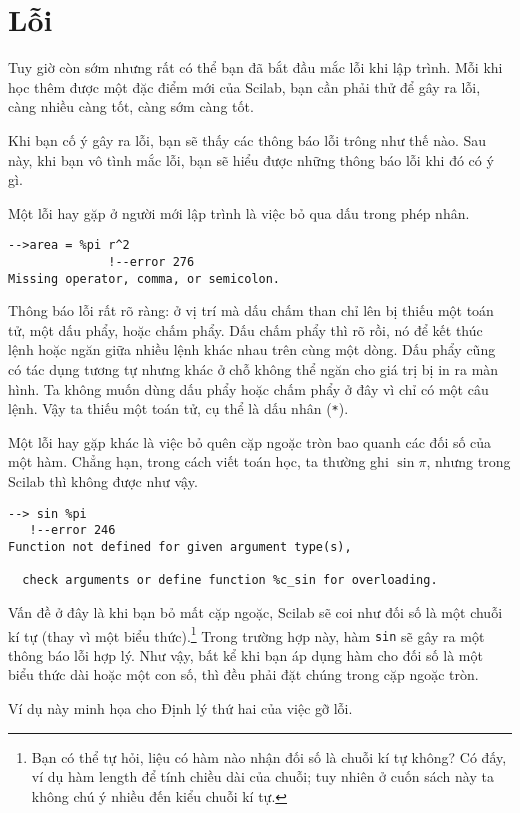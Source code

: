 \documentclass[12pt]{book}
\begin{document}
\section{Lỗi}

Tuy giờ còn sớm nhưng rất có thể bạn đã bắt đầu mắc lỗi khi lập trình.
Mỗi khi học thêm được một đặc điểm mới của Scilab, bạn cần phải
thử để gây ra lỗi, càng nhiều càng tốt, càng sớm càng tốt.

Khi bạn cố ý gây ra lỗi, bạn sẽ thấy các thông báo lỗi trông như thế nào.
Sau này, khi bạn vô tình mắc lỗi, bạn sẽ hiểu được những thông báo lỗi
khi đó có ý gì.

Một lỗi hay gặp ở người mới lập trình là việc bỏ qua dấu {\tt *} trong
phép nhân.

\begin{verbatim}
-->area = %pi r^2
              !--error 276 
Missing operator, comma, or semicolon.
\end{verbatim}
%
Thông báo lỗi rất rõ ràng: ở vị trí mà dấu chấm than chỉ lên bị thiếu một
toán tử, một dấu phẩy, hoặc chấm phẩy. Dấu chấm phẩy thì rõ rồi, nó
để kết thúc lệnh hoặc ngăn giữa nhiều lệnh khác nhau trên cùng một dòng.
Dấu phẩy cũng có tác dụng tương tự nhưng khác ở chỗ không thể ngăn
cho giá trị bị in ra màn hình. Ta không muốn dùng dấu phẩy hoặc chấm phẩy
ở đây vì chỉ có một câu lệnh. Vậy ta thiếu một toán tử, cụ thể là dấu nhân
(\texttt{*}).

Một lỗi hay gặp khác là việc bỏ quên cặp ngoặc tròn bao quanh các
đối số của một hàm. Chẳng hạn, trong cách viết toán học, ta thường 
ghi $\sin \pi$, nhưng trong Scilab thì không được như vậy.

\begin{verbatim}
--> sin %pi
   !--error 246 
Function not defined for given argument type(s),

  check arguments or define function %c_sin for overloading.
\end{verbatim}

Vấn đề ở đây là khi bạn bỏ mất cặp ngoặc, Scilab sẽ coi như 
đối số là một chuỗi kí tự (thay vì một biểu thức).\footnote{Bạn có thể tự hỏi,
liệu có hàm nào nhận đối số là chuỗi kí tự không? Có đấy, ví dụ hàm
length để tính chiều dài của chuỗi; tuy nhiên ở cuốn sách này ta không chú ý 
nhiều đến kiểu chuỗi kí tự.} Trong trường hợp này, hàm {\tt sin} sẽ gây ra 
một thông báo lỗi hợp lý. Như vậy, bất kể khi bạn áp dụng hàm cho đối số
là một biểu thức dài hoặc một con số, thì đều phải đặt chúng trong cặp
ngoặc tròn.

Ví dụ này minh họa cho Định lý thứ hai của việc gỡ lỗi.
\end{document}
